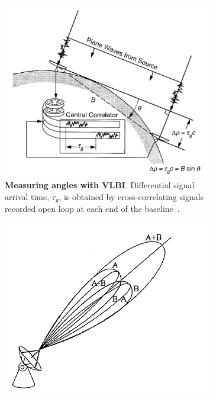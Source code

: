 \begin{figure}
    \centering
    \begin{subfigure}{.48\textwidth}
        \centering
        \captionsetup{format=hang} %
        \includegraphics[width=.99\linewidth]{graphics/vlbi.PNG}
        \caption{
            \textbf{Measuring angles with VLBI}. Differential signal arrival time,
            $\tau_g$, is obtained by cross-correlating signals recorded open loop at
            each end of the baseline~\cite[p.~48]{Catherine2005}.
        }
        \label{fig:monopulse}
    \end{subfigure}\hspace{0.03\textwidth}
    \begin{subfigure}{.48\textwidth}
        \centering
        \captionsetup{format=hang} %
        \includegraphics[width=.99\linewidth]{graphics/monopulse.PNG}

\end{subfigure}
\end{figure}
